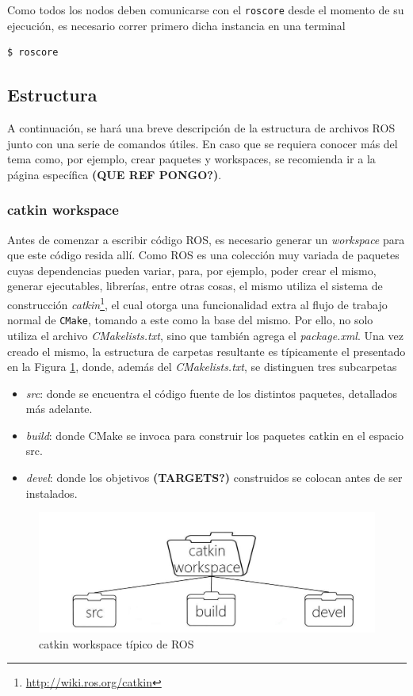 Como todos los nodos deben comunicarse con el \texttt{roscore} desde el momento de su ejecución, es necesario correr primero dicha instancia en una terminal
\begin{lstlisting}[language=bash]
  $ roscore
\end{lstlisting}

\subsection{Estructura}
A continuación, se hará una breve descripción de la estructura de archivos ROS junto con una serie de comandos útiles. En caso que se requiera conocer más del tema como, por ejemplo, crear paquetes y workspaces, se recomienda ir a la página específica \textbf{(QUE REF PONGO?)}.

\subsubsection{catkin workspace}
Antes de comenzar a escribir código ROS, es necesario generar un \textit{workspace} para que este código resida allí. Como ROS es una colección muy variada de paquetes cuyas dependencias pueden variar, para, por ejemplo, poder crear el mismo, generar ejecutables, librerías, entre otras cosas, el mismo utiliza el sistema de construcción \textit{catkin}\footnote{\url{http://wiki.ros.org/catkin}}, el cual otorga una funcionalidad extra al flujo de trabajo normal de \texttt{CMake}, tomando a este como la base del mismo. Por ello, no solo utiliza el archivo \textit{CMakelists.txt}, sino que también agrega el \textit{package.xml}. Una vez creado el mismo, la estructura de carpetas resultante es típicamente el presentado en la Figura \ref{fig:catkinworkspace}, donde, además del \textit{CMakelists.txt}, se distinguen tres subcarpetas
\begin{itemize}
    \item \textit{src}: donde se encuentra el código fuente de los distintos paquetes, detallados más adelante.
    \item \textit{build}: donde CMake se invoca para construir los paquetes catkin en el espacio src.
    \item \textit{devel}: donde los objetivos \textbf{(TARGETS?)} construidos se colocan antes de ser instalados.
\end{itemize}
\begin{figure}[!ht]
    \centering
    \includegraphics[width=\textwidth]{Img/CatkinWorkspace.jpeg}
    \caption{catkin workspace típico de ROS}
    \label{fig:catkinworkspace}
\end{figure}

